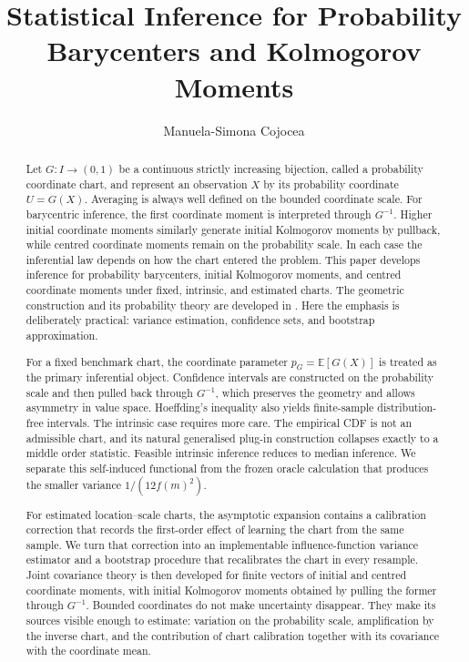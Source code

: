 \documentclass[11pt,a4paper]{article}
\title{Statistical Inference for Probability Barycenters and Kolmogorov Moments}
\author{Manuela-Simona Cojocea}
\date{}
\theoremstyle{definition}
\newcommand{\E}{\mathbb{E}}
\begin{document}
\maketitle

\begin{abstract}
Let $G:I\to(0,1)$ be a continuous strictly increasing bijection, called a probability coordinate chart, and represent an observation $X$ by its probability coordinate $U=G(X)$. Averaging is always well defined on the bounded coordinate scale. For barycentric inference, the first coordinate moment is interpreted through $G^{-1}$. Higher initial coordinate moments similarly generate initial Kolmogorov moments by pullback, while centred coordinate moments remain on the probability scale. In each case the inferential law depends on how the chart entered the problem. This paper develops inference for probability barycenters, initial Kolmogorov moments, and centred coordinate moments under fixed, intrinsic, and estimated charts. The geometric construction and its probability theory are developed in \cite{Cojocea2026}. Here the emphasis is deliberately practical: variance estimation, confidence sets, and bootstrap approximation.

For a fixed benchmark chart, the coordinate parameter $p_G=\E[G(X)]$ is treated as the primary inferential object. Confidence intervals are constructed on the probability scale and then pulled back through $G^{-1}$, which preserves the geometry and allows asymmetry in value space. Hoeffding's inequality also yields finite-sample distribution-free intervals. The intrinsic case requires more care. The empirical CDF is not an admissible chart, and its natural generalised plug-in construction collapses exactly to a middle order statistic. Feasible intrinsic inference reduces to median inference. We separate this self-induced functional from the frozen oracle calculation that produces the smaller variance $1/(12f(m)^2)$.

For estimated location--scale charts, the asymptotic expansion contains a calibration correction that records the first-order effect of learning the chart from the same sample. We turn that correction into an implementable influence-function variance estimator and a bootstrap procedure that recalibrates the chart in every resample. Joint covariance theory is then developed for finite vectors of initial and centred coordinate moments, with initial Kolmogorov moments obtained by pulling the former through $G^{-1}$. Bounded coordinates do not make uncertainty disappear. They make its sources visible enough to estimate: variation on the probability scale, amplification by the inverse chart, and the contribution of chart calibration together with its covariance with the coordinate mean.
\end{abstract}
\end{document}
